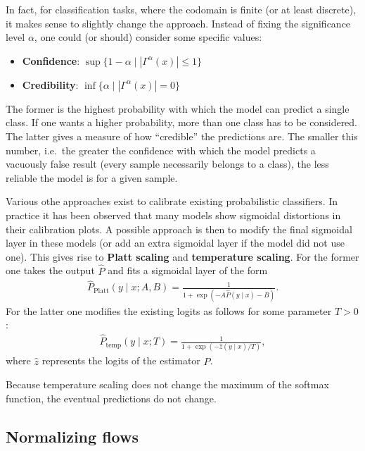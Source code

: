     In fact, for classification tasks, where the codomain is finite (or at least discrete), it makes sense to slightly change the approach. Instead of fixing the significance level $\alpha$, one could (or should) consider some specific values:
    \begin{itemize}
        \item\textbf{Confidence}: $\sup\{1-\alpha\mid|\Gamma^\alpha(x)|\leq1\}$
        \item\textbf{Credibility}: $\inf\{\alpha\mid|\Gamma^\alpha(x)|=0\}$
    \end{itemize}
    The former is the highest probability with which the model can predict a single class. If one wants a higher probability, more than one class has to be considered. The latter gives a measure of how ``credible'' the predictions are. The smaller this number, i.e.~the greater the confidence with which the model predicts a vacuously false result (every sample necessarily belongs to a class), the less reliable the model is for a given sample.

    Various othe approaches exist to calibrate existing probabilistic classifiers. In practice it has been observed that many models show sigmoidal distortions in their calibration plots. A possible approach is then to modify the final sigmoidal layer in these models (or add an extra sigmoidal layer if the model did not use one). This gives rise to \textbf{Platt scaling} and \textbf{temperature scaling}. For the former one takes the output $\hat{P}$ and fits a sigmoidal layer of the form
    \begin{gather}
        \hat{P}_\text{Platt}(y\mid x;A,B) = \frac{1}{1+\exp(-A\hat{P}(y\mid x)-B)}.
    \end{gather}
    For the latter one modifies the existing logits as follows for some parameter $T>0$:
    \begin{gather}
        \hat{P}_\text{temp}(y\mid x;T) = \frac{1}{1+\exp(-\hat{z}(y\mid x)/T)},
    \end{gather}
    where $\hat{z}$ represents the logits of the estimator $\hat{P}$.

    \begin{remark}[Accuracy]
        Because temperature scaling does not change the maximum of the softmax function, the eventual predictions do not change.
    \end{remark}

\subsection{Normalizing flows}

